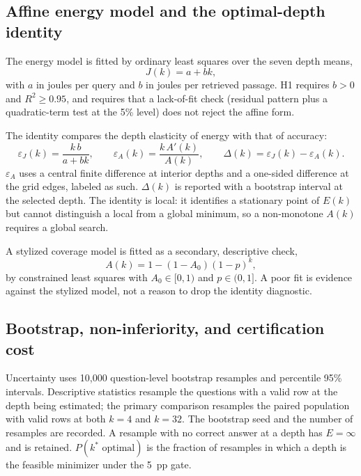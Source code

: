 \documentclass[a4paper,fleqn]{cas-sc}
\begin{document}
\subsection{Affine energy model and the optimal-depth identity}

The energy model is fitted by ordinary least squares over the seven depth means,
\begin{equation}
J(k)=a+bk,
\label{eq:affine}
\end{equation}
with $a$ in joules per query and $b$ in joules per retrieved passage. H1 requires $b>0$ and
$R^2\ge0.95$, and requires that a lack-of-fit check (residual pattern plus a quadratic-term
test at the 5\% level) does not reject the affine form.

The identity compares the depth elasticity of energy with that of accuracy:
\begin{equation}
\varepsilon_J(k)=\frac{k\,b}{a+bk},
\qquad
\varepsilon_A(k)=\frac{k\,A'(k)}{A(k)},
\qquad
\Delta(k)=\varepsilon_J(k)-\varepsilon_A(k).
\label{eq:identity}
\end{equation}
$\varepsilon_A$ uses a central finite difference at interior depths and a one-sided difference
at the grid edges, labeled as such. $\Delta(k)$ is reported with a bootstrap interval at the
selected depth. The identity is local: it identifies a stationary point of $E(k)$ but cannot
distinguish a local from a global minimum, so a non-monotone $A(k)$ requires a global search.

A stylized coverage model is fitted as a secondary, descriptive check,
\begin{equation}
A(k)=1-(1-A_0)(1-p)^k,
\label{eq:coverage}
\end{equation}
by constrained least squares with $A_0\in[0,1)$ and $p\in(0,1]$. A poor fit is evidence against
the stylized model, not a reason to drop the identity diagnostic.

\subsection{Bootstrap, non-inferiority, and certification cost}

Uncertainty uses 10{,}000 question-level bootstrap resamples and percentile 95\% intervals.
Descriptive statistics resample the questions with a valid row at the depth being estimated;
the primary comparison resamples the paired population with valid rows at both $k=4$ and
$k=32$. The bootstrap seed and the number of resamples are recorded. A resample with no correct
answer at a depth has $E=\infty$ and is retained. $P(k^{*}\text{ optimal})$ is the fraction of
resamples in which a depth is the feasible minimizer under the 5~pp gate.
\end{document}
